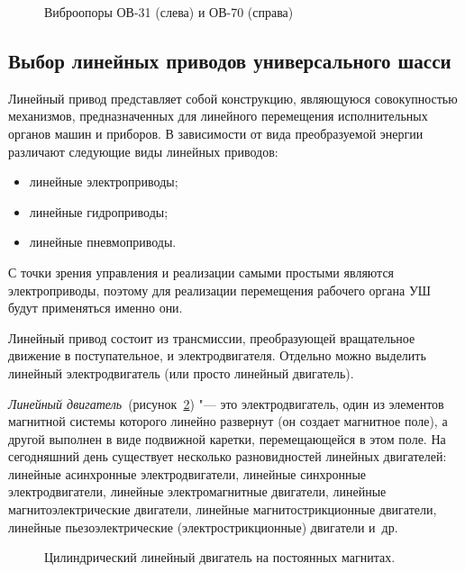 \begin{figure}[ht]
	\caption[Виброопоры ОВ-31 и ОВ-70]{Виброопоры ОВ-31 (слева) и ОВ-70 (справа)}\label{fig:vibro}
\end{figure}

\subsection{Выбор линейных приводов универсального шасси}

Линейный привод представляет собой конструкцию, являющуюся совокупностью механизмов, предназначенных для линейного перемещения исполнительных органов машин и приборов. В зависимости от вида преобразуемой энергии различают следующие виды линейных приводов:

\begin{itemize}
	\item линейные электроприводы;
	\item линейные гидроприводы;
	\item линейные пневмоприводы.
\end{itemize}

С точки зрения управления и реализации самыми простыми являются электроприводы, поэтому для реализации перемещения рабочего органа УШ будут применяться именно они.

Линейный привод состоит из трансмиссии, преобразующей вращательное движение в поступательное, и электродвигателя. Отдельно можно выделить линейный электродвигатель (или просто линейный двигатель).

\textit{Линейный двигатель}~(рисунок~\cref{fig:lindrive}) "--- это электродвигатель, один из элементов магнитной системы которого линейно развернут (он создает магнитное поле), а другой выполнен в виде подвижной каретки, перемещающейся в этом поле. На сегодняшний день существует несколько разновидностей линейных двигателей: линейные асинхронные электродвигатели, линейные синхронные электродвигатели, линейные электромагнитные двигатели, линейные магнитоэлектрические двигатели, линейные магнитострикционные двигатели, линейные пьезоэлектрические (электрострикционные) двигатели и~др.

\begin{figure}[ht]
	\caption{Цилиндрический линейный двигатель на постоянных магнитах.}\label{fig:lindrive}
\end{figure}


